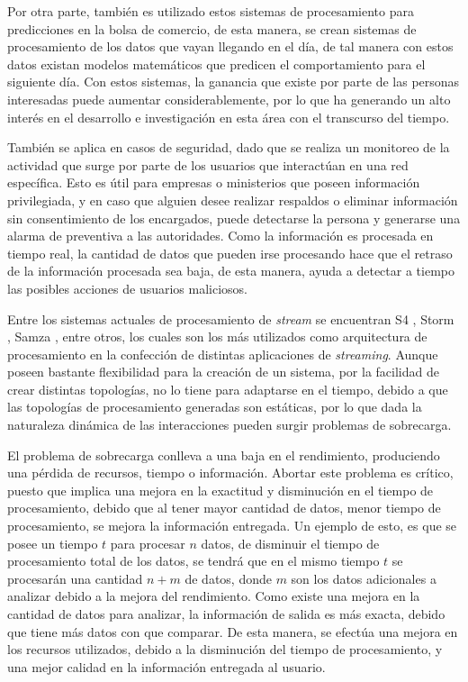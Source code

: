 Por otra parte, también es utilizado estos sistemas de procesamiento para predicciones en la bolsa de comercio, de esta manera, se crean sistemas de procesamiento de los datos que vayan llegando en el día, de tal manera con estos datos existan modelos matemáticos que predicen el comportamiento para el siguiente día. Con estos sistemas, la ganancia que existe por parte de las personas interesadas puede aumentar considerablemente, por lo que ha generando un alto interés en el desarrollo e investigación en esta área con el transcurso del tiempo.

También se aplica en casos de seguridad, dado que se realiza un monitoreo de la actividad que surge por parte de los usuarios que interactúan en una red específica. Esto es útil para empresas o ministerios que poseen información privilegiada, y en caso que alguien desee realizar respaldos o eliminar información sin consentimiento de los encargados, puede detectarse la persona y generarse una alarma de preventiva a las autoridades. Como la información es procesada en tiempo real, la cantidad de datos que pueden irse procesando hace que el retraso de la información procesada sea baja, de esta manera, ayuda a detectar a tiempo las posibles acciones de usuarios maliciosos.

Entre los sistemas actuales de procesamiento de \textsl{stream} se encuentran S4 \citep{s4yahoo}, Storm \citep{stormtwitter}, Samza \citep{samza}, entre otros, los cuales son los más utilizados como arquitectura de procesamiento en la confección de distintas aplicaciones de \textsl{streaming}. Aunque poseen bastante flexibilidad para la creación de un sistema, por la facilidad de crear distintas topologías, no lo tiene para adaptarse en el tiempo, debido a que las topolog\'ias de procesamiento generadas son est\'aticas, por lo que dada la naturaleza din\'amica de las interacciones pueden surgir problemas de sobrecarga.

El problema de sobrecarga conlleva a una baja en el rendimiento, produciendo una pérdida de recursos, tiempo o información. Abortar este problema es cr\'itico, puesto que implica una mejora en la exactitud y disminución en el tiempo de procesamiento, debido que al tener mayor cantidad de datos, menor tiempo de procesamiento, se mejora la información entregada. Un ejemplo de esto, es que se posee un tiempo $t$ para procesar $n$ datos, de disminuir el tiempo de procesamiento total de los datos, se tendrá que en el mismo tiempo $t$ se procesarán una cantidad $n+m$ de datos, donde $m$ son los datos adicionales a analizar debido a la mejora del rendimiento. Como existe una mejora en la cantidad de datos para analizar, la información de salida es más exacta, debido que tiene más datos con que comparar. De esta manera, se efectúa una mejora en los recursos utilizados, debido a la disminución del tiempo de procesamiento, y una mejor calidad en la información entregada al usuario.

